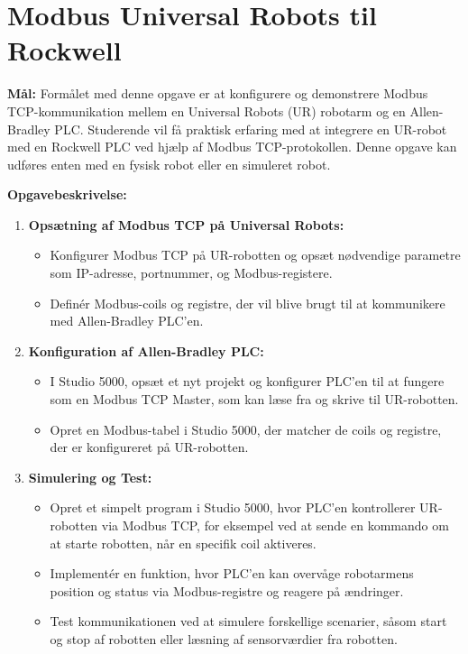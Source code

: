 \section{Modbus Universal Robots til Rockwell}
\label{sec:ur_ab_integration_opgaver}

\textbf{Mål:} Formålet med denne opgave er at konfigurere og demonstrere Modbus TCP-kommunikation mellem en Universal Robots (UR) robotarm og en Allen-Bradley PLC. Studerende vil få praktisk erfaring med at integrere en UR-robot med en Rockwell PLC ved hjælp af Modbus TCP-protokollen. Denne opgave kan udføres enten med en fysisk robot eller en simuleret robot.

\textbf{Opgavebeskrivelse:}
\begin{enumerate}
	\item \textbf{Opsætning af Modbus TCP på Universal Robots:}
	\begin{itemize}
		\item Konfigurer Modbus TCP på UR-robotten og opsæt nødvendige parametre som IP-adresse, portnummer, og Modbus-registere.
		\item Definér Modbus-coils og registre, der vil blive brugt til at kommunikere med Allen-Bradley PLC'en.
	\end{itemize}
	
	\item \textbf{Konfiguration af Allen-Bradley PLC:}
	\begin{itemize}
		\item I Studio 5000, opsæt et nyt projekt og konfigurer PLC'en til at fungere som en Modbus TCP Master, som kan læse fra og skrive til UR-robotten.
		\item Opret en Modbus-tabel i Studio 5000, der matcher de coils og registre, der er konfigureret på UR-robotten.
	\end{itemize}
	
	\item \textbf{Simulering og Test:}
	\begin{itemize}
		\item Opret et simpelt program i Studio 5000, hvor PLC'en kontrollerer UR-robotten via Modbus TCP, for eksempel ved at sende en kommando om at starte robotten, når en specifik coil aktiveres.
		\item Implementér en funktion, hvor PLC'en kan overvåge robotarmens position og status via Modbus-registre og reagere på ændringer.
		\item Test kommunikationen ved at simulere forskellige scenarier, såsom start og stop af robotten eller læsning af sensorværdier fra robotten.
	\end{itemize}
	

\end{enumerate}
